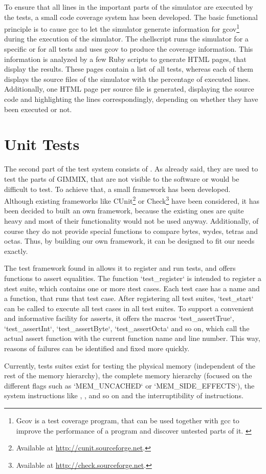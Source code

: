 To ensure that all lines in the important parts of the simulator are executed by the tests, a small code coverage system has been developed. The basic functional principle is to cause \gls{gcc} to let the simulator generate information for gcov\footnote{Gcov is a test coverage program, that can be used together with \gls{gcc} to improve the performance of a program and discover untested parts of it. \citep{gcov}} during the execution of the simulator. The shellscript  runs the simulator for a specific or for all tests and uses gcov to produce the coverage information. This information is analyzed by a few \gls{Ruby} scripts to generate HTML pages, that display the results. These pages contain a list of all tests, whereas each of them displays the source files of the simulator with the percentage of executed lines. Additionally, one HTML page per source file is generated, displaying the source code and highlighting the lines correspondingly, depending on whether they have been executed or not.

\section{Unit Tests}

The second part of the test system consists of . As already said, they are used to test the parts of GIMMIX, that are not visible to the software or would be difficult to test. To achieve that, a small  framework has been developed. Although existing frameworks like CUnit\footnote{Available at \url{http://cunit.sourceforge.net}.} or Check\footnote{Available at \url{http://check.sourceforge.net}.} have been considered, it has been decided to built an own framework, because the existing ones are quite heavy and most of their functionality would not be used anyway. Additionally, of course they do not provide special functions to compare bytes, wydes, tetras and octas. Thus, by building our own framework, it can be designed to fit our needs exactly.

The test framework found in  allows it to register and run tests, and offers functions to assert equalities. The function `test_register` is intended to register a \i{test suite}, which contains one or more \i{test cases}. Each test case has a name and a function, that runs that test case. After registering all test suites, `test_start` can be called to execute all test cases in all test suites. To support a convenient and informative facility for asserts, it offers the macros `test_assertTrue`, `test_assertInt`, `test_assertByte`, `test_assertOcta` and so on, which call the actual assert function with the current function name and line number. This way, reasons of failures can be identified and fixed more quickly.

Currently, tests suites exist for testing the physical memory (independent of the rest of the memory hierarchy), the complete memory hierarchy (focused on the different flags such as `MEM_UNCACHED` or `MEM_SIDE_EFFECTS`), the system instructions like , ,  and so on and the interruptibility of instructions.

